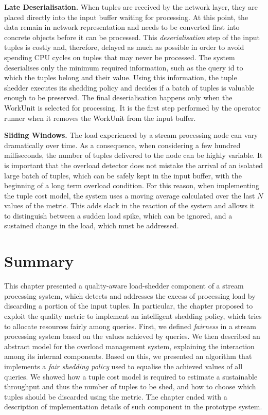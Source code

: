 \textbf{Late Deserialisation.} When tuples are received by the network layer, they are placed
directly into the input buffer waiting for processing. At this point, the data remain in
network representation and needs to be converted first into concrete objects before it can be processed.
This \emph{deserialisation} step of the input tuples is costly and, therefore, delayed as much as
possible in order to avoid spending CPU cycles on tuples that may never be processed. The system
deserialises only the minimum required information, such as the query id to which the tuples belong
and their \sic value. Using this information, the tuple shedder executes its shedding policy and decides
if a batch of tuples is valuable enough to be preserved. The final
deserialisation happens only when the WorkUnit is selected for processing. It is the first step performed
by the operator runner when it removes the WorkUnit from the input buffer.

\textbf{Sliding Windows.} The load experienced by a stream processing node can vary dramatically over
time. As a consequence, when considering a few hundred milliseconds, the number of
tuples delivered to the node can be highly variable. It is important that the overload detector does
not mistake the arrival of an isolated large batch of tuples, which can be safely kept in the input
buffer, with the beginning of a long term overload condition. For this reason, when
implementing the tuple cost model, the system uses a moving average
calculated over the last $N$ values of the metric. This adds slack in the reaction
of the system and allows it to distinguish between a sudden load spike, which can be ignored, and
a sustained change in the load, which must be addressed.

\section{Summary}

This chapter presented a quality-aware load-shedder component of a stream processing system, which
detects and addresses the excess of processing load by discarding a portion of the input tuples. In
particular, the chapter proposed to exploit the \sic quality metric to implement an intelligent shedding
policy, which tries to allocate resources fairly among queries. First, we defined \emph{fairness} in a
stream processing system based on the \sic values achieved by queries. We then described an abstract
model for the overload management system, explaining the interaction among its internal components. 
Based on this, we presented an algorithm that implements a \emph{fair shedding policy} used to
equalise the achieved \sic values of all queries. We showed how a tuple cost model is required to
estimate a sustainable throughput and thus the number of tuples to be shed, and how to choose which
tuples should be discarded using the \sic metric. The chapter ended with a description of implementation
details of such component in the \sys prototype system. 



